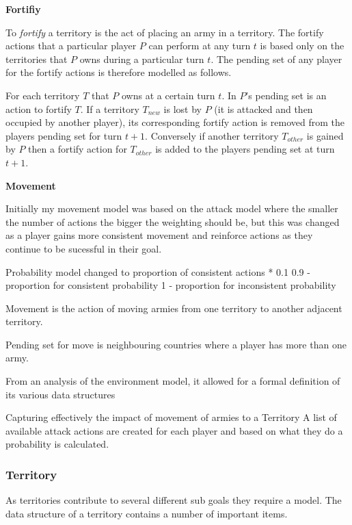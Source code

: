 \documentclass[parskip]{cs4rep}
\begin{document}
\textbf{Fortifiy}

To \textit{fortify} a territory is the act of placing an army in a territory. The fortify actions that a particular player $P$ can perform at any turn $t$ is based only on the territories that $P$ owns during a particular turn $t$. The pending set of any player for the fortify actions is therefore modelled as follows. 

For each territory $T$ that $P$ owns at a certain turn $t$. In $P$'s pending set is an action to fortify $T$. If a territory $T_{new}$ is lost by $P$ (it is attacked and then occupied by another player), its corresponding fortify action is removed from the players pending set for turn $t+1$. Conversely if another territory $T_{other}$ is gained by $P$ then a fortify action for $T_{other}$ is added to the players pending set at turn $t+1$.\newline

\textbf{Movement}

Initially my movement model was based on the attack model where the smaller the number of actions the bigger the weighting should be, but this was changed as a player gains more consistent movement and reinforce actions as they continue to be sucessful in their goal.

Probability model changed to proportion of consistent actions * 0.1 
0.9 - proportion for consistent probability
1 - proportion for inconsistent probability

Movement is the action of moving armies from one territory to another adjacent territory.

Pending set for move is neighbouring countries where a player has more than one army.

From an analysis of the environment model, it allowed for a formal definition of its various data structures

Capturing effectively the impact of movement of armies to a Territory 
A list of available attack actions are created for each player and based on what they do a probability is calculated.\newline

\subsubsection{Territory}

As territories contribute to several different sub goals they require a model. The data structure of a territory contains a number of important items.
\end{document}

